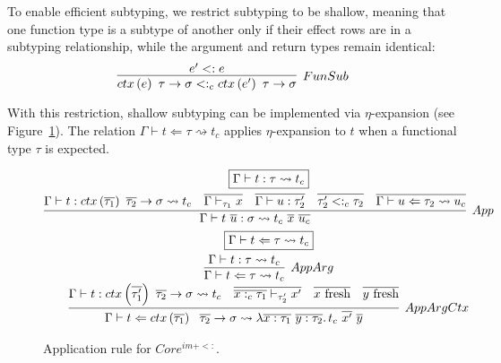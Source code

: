\documentclass[acmsmall,review,screen]{acmart}
\newcommand{\mathframebox}[1]{\framebox{$\displaystyle #1$}}
\newcommand{\ap}{~}
\newcommand{\ctx}[1]{ctx\left(#1\right)~}
\newcommand{\step}{\rightsquigarrow}
\begin{document}
To enable efficient subtyping, we restrict subtyping to be shallow, meaning that one function type is a subtype of another only if their effect rows are in a subtyping relationship, while the argument and return types remain identical:
\[
    \infer[FunSub]{\ctx{e} \tau \to \sigma <:_c \ctx{e'} \tau\to\sigma}{e' <: e}
\]

With this restriction, shallow subtyping can be implemented via $\eta$-expansion (see Figure~\ref{fig:fim-sub-app}).
The relation $\Gamma\vdash t\Leftarrow \tau \step t_c$ applies $\eta$-expansion to $t$ when a functional type $\tau$ is expected.

\begin{figure}
    \begin{gather*}
        \mathframebox{\Gamma\vdash t : \tau \step t_c} \\
        \infer[App]{
            \Gamma\vdash t\ap\overline{u} : \sigma \step t_c \ap \overline{x} \ap \overline{u_c}
        }{
            \Gamma\vdash t : \ctx{\overline{\tau_1}} \overline{\tau_2}\to \sigma \step t_c
            &
            \overline{\Gamma \vdash_{\tau_1} x}
            &
            \overline{\Gamma\vdash u : \tau_2'}
            &
            \overline{\tau_2' <:_c \tau_2}
            &
            \overline{\Gamma\vdash u \Leftarrow \tau_2 \step u_c}
        } \\
        \mathframebox{\Gamma\vdash t \Leftarrow \tau \step t_c} \\
        \begin{array}{c}
            \infer[AppArg]{
                \Gamma\vdash t \Leftarrow \tau \step t_c
            }{
                \Gamma\vdash t : \tau \step t_c
            }
            \\
            \infer[AppArgCtx]{
                \Gamma \vdash t \Leftarrow \ctx{\overline{\tau_1}} ~\overline{\tau_2}\to\sigma\step \lambda \overline{x : \tau_1}~\overline{y : \tau_2}\ldotp t_c\ap \overline{x'}\ap\overline{y}
            }{
                \Gamma \vdash t : \ctx{\overline{\tau_1'}} \overline{\tau_2}\to\sigma \step t_c
                &
                \overline{\overline{x :_c \tau_1} \vdash_{\tau_2'} x'}
                &
                \overline{x \text{ fresh}}
                &
                \overline{y \text{ fresh}}
            }
        \end{array}
    \end{gather*}
    \caption{Application rule for $Core^{im + <:}$.}
    \label{fig:fim-sub-app}
\end{figure}
\end{document}
